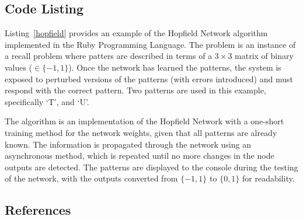 \subsection{Code Listing}
Listing~\ref{hopfield} provides an example of the Hopfield Network algorithm implemented in the Ruby Programming Language. 
The problem is an instance of a recall problem where patters are described in terms of a $3 \times 3$ matrix of binary values ($\in \{-1,1\}$). Once the network has learned the patterns, the system is exposed to perturbed versions of the patterns (with errors introduced) and must respond with the correct pattern. Two patterns are used in this example, specifically `T', and `U'.

The algorithm is an implementation of the Hopfield Network with a one-short training method for the network weights, given that all patterns are already known. The information is propagated through the network using an asynchronous method, which is repeated until no more changes in the node outputs are detected. The patterns are displayed to the console during the testing of the network, with the outputs converted from $\{-1,1\}$ to $\{0,1\}$ for readability.



\subsection{References}

